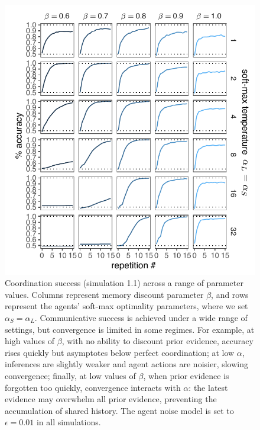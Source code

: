 \documentclass[10pt, man, floatsintext]{apa7}
\begin{document}
 \begin{figure}
\centering
    \includegraphics[scale=1.2]{arbitrariness_grid.pdf}
  \caption{Coordination success (simulation 1.1) across a range of parameter values. Columns represent memory discount parameter $\beta$, and rows represent the agents' soft-max optimality parameters, where we set $\alpha_S=\alpha_L$. Communicative success is achieved under a wide range of settings, but convergence is limited in some regimes. For example, at high values of $\beta$, with no ability to discount prior evidence, accuracy rises quickly but asymptotes below perfect coordination; at low $\alpha$, inferences are slightly weaker and agent actions are noisier, slowing convergence; finally, at low values of $\beta$, when prior evidence is forgotten too quickly, convergence interacts with $\alpha$: the latest evidence may overwhelm all prior evidence, preventing the accumulation of shared history. The agent noise model is set to $\epsilon = 0.01$ in all simulations.}
  \label{fig:arbitrariness_grid}
\end{figure}
\end{document}
